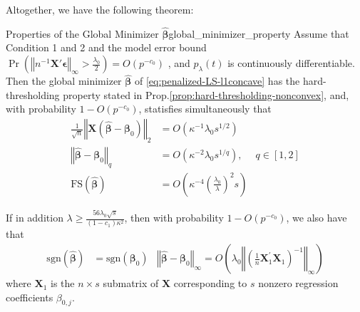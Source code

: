 \documentclass[twoside]{article}
\begin{document}
Altogether, we have the following theorem:
\begin{theorem}{Properties of the Global Minimizer $\hat{\boldsymbol{\beta}}$}{global_minimizer_property}
    Assume that Condition 1 and 2 and the model error bound $\Pr \left( \left\Vert n^{-1}\mathbf{X}'\boldsymbol{\epsilon}  \right\Vert _{\infty} >\frac{\lambda_0}{2} \right) = O\left(p^{-c_0}\right)$ , and $p_{\lambda}(t)$ is continuously differentiable. Then the global minimizer $\hat{\boldsymbol{\beta}}$ of \ref{eq:penalized-LS-l1concave} has the hard-thresholding property stated in Prop.\ref{prop:hard-thresholding-nonconvex}, and, with probability $1-O(p^{-c_0})$, statisfies simultaneously that
    \begin{align}
        \frac{1}{\sqrt{n}}\left\Vert \mathbf{X}\left( \hat{\boldsymbol{\beta}} -\boldsymbol{\beta}_0 \right) \right\Vert _2 &= O(\kappa^{-1}\lambda_0 s^{1/2}) \\
        \left\Vert \hat{\boldsymbol{\beta}}-\boldsymbol{\beta}_0 \right\Vert _q &= O(\kappa^{-2}\lambda_0 s^{1/q}), & q\in[1,2]\\
        \mathrm{FS}\left(\hat{\boldsymbol{\beta}}\right) &= O\left( \kappa^{-4} \left(\frac{\lambda_0}{\lambda}\right)^2 s \right)
    \end{align}

    If in addition $\lambda \geq \frac{56\lambda_0\sqrt{s}}{(1-c_1)\kappa^2}$, then with probability $1-O(p^{-c_0})$, we also have that 
    \begin{align*}
        \mathrm{sgn}\left(\hat{\boldsymbol{\beta}}\right) &= \mathrm{sgn}\left(\boldsymbol{\beta}_0\right) & \left\Vert \hat{\boldsymbol{\beta}}-\boldsymbol{\beta}_0 \right\Vert _{\infty} = O\left(\lambda_0\left\Vert \left(\frac{1}{n}\mathbf{X}^{\prime}_1\mathbf{X}_1 \right)^{-1} \right\Vert _{\infty}\right)
    \end{align*}
    where $\mathbf{X}_1$ is the $n\times s$ submatrix of $\mathbf{X}$ corresponding to $s$ nonzero regression coefficients $\beta_{0,j}$.
\end{theorem}

\newpage


\end{document}
